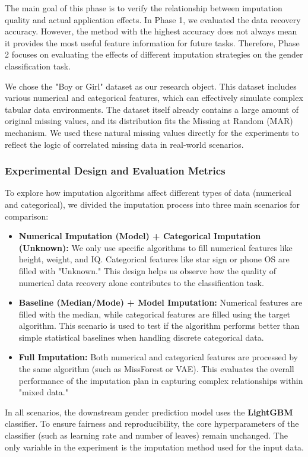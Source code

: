 \documentclass[twocolumn, 9pt]{extarticle}
\begin{document}
The main goal of this phase is to verify the relationship between imputation quality and actual application effects. In Phase 1, we evaluated the data recovery accuracy. However, the method with the highest accuracy does not always mean it provides the most useful feature information for future tasks. Therefore, Phase 2 focuses on evaluating the effects of different imputation strategies on the gender classification task.

We chose the "Boy or Girl" dataset as our research object. This dataset includes various numerical and categorical features, which can effectively simulate complex tabular data environments. The dataset itself already contains a large amount of original missing values, and its distribution fits the Missing at Random (MAR) mechanism. We used these natural missing values directly for the experiments to reflect the logic of correlated missing data in real-world scenarios.

\subsubsection{Experimental Design and Evaluation Metrics}

To explore how imputation algorithms affect different types of data (numerical and categorical), we divided the imputation process into three main scenarios for comparison:

\begin{itemize}
    \item \textbf{Numerical Imputation (Model) + Categorical Imputation (Unknown):} We only use specific algorithms to fill numerical features like height, weight, and IQ. Categorical features like star sign or phone OS are filled with "Unknown." This design helps us observe how the quality of numerical data recovery alone contributes to the classification task.
    \item \textbf{Baseline (Median/Mode) + Model Imputation:} Numerical features are filled with the median, while categorical features are filled using the target algorithm. This scenario is used to test if the algorithm performs better than simple statistical baselines when handling discrete categorical data.
    \item \textbf{Full Imputation:} Both numerical and categorical features are processed by the same algorithm (such as MissForest or VAE). This evaluates the overall performance of the imputation plan in capturing complex relationships within "mixed data."
\end{itemize}
In all scenarios, the downstream gender prediction model uses the \textbf{LightGBM} classifier. To ensure fairness and reproducibility, the core hyperparameters of the classifier (such as learning rate and number of leaves) remain unchanged. The only variable in the experiment is the imputation method used for the input data.
\end{document}
